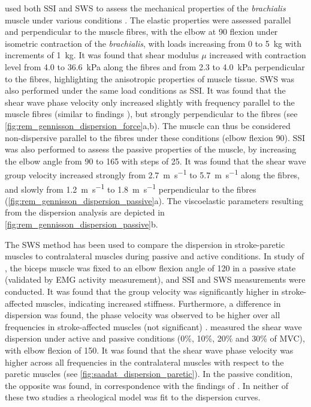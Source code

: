 \citeauthor{gennisson_viscoelastic_2010} used both SSI and SWS to assess the mechanical properties of the \textit{brachialis} muscle under various conditions \cite{gennisson_viscoelastic_2010}. The elastic properties were assessed parallel and perpendicular to the muscle fibres, with the elbow at \SI{90}{\deg} flexion under isometric contraction of the \textit{brachialis}, with loads increasing from 0 to \SI{5}{\kilogram} with increments of \SI{1}{\kilogram}. It was found that shear modulus $\mu$ increased with contraction level from 4.0 to \SI{36.6}{\kilo\pascal} along the fibres and from 2.3 to \SI{4.0}{\kilo\pascal} perpendicular to the fibres, highlighting the anisotropic properties of muscle tissue. SWS was also performed under the same load conditions as SSI. It was found that the shear wave phase velocity only increased slightly with frequency parallel to the muscle fibres (similar to findings \citet{deffieux_shear_2009}), but strongly perpendicular to the fibres (see \autoref{fig:rem_gennisson_dispersion_force}a,b). The muscle can thus be considered non-dispersive parallel to the fibres under these conditions (elbow flexion \SI{90}{\deg}). SSI was also performed to assess the passive properties of the muscle, by increasing the elbow angle from 90 to \SI{165}{\deg} with steps of \SI{25}{\deg}. It was found that the shear wave group velocity increased strongly from \SI{2.7}{\meter\per\second} to \SI{5.7}{\meter\per\second} along the fibres, and slowly from \SI{1.2}{\meter\per\second} to \SI{1.8}{\meter\per\second} perpendicular to the fibres (\autoref{fig:rem_gennisson_dispersion_passive}a). The viscoelastic parameters resulting from the dispersion analysis are depicted in \autoref{fig:rem_gennisson_dispersion_passive}b. %


The SWS method has been used to compare the dispersion in stroke-paretic muscles to contralateral muscles during passive \cite{rasool_altered_2016} and active \cite{saadat_frequency_2018} conditions. In study of \citeauthor{rasool_altered_2016}, the biceps muscle was fixed to an elbow flexion angle of \SI{120}{\deg} in a passive state (validated by EMG activity measurement), and SSI and SWS measurements were conducted. It was found that the group velocity was significantly higher in stroke-affected muscles, indicating increased stiffness. Furthermore, a difference in dispersion was found, the phase velocity was observed to be higher over all frequencies in stroke-affected muscles (not significant) \cite{rasool_altered_2016}. \citeauthor{saadat_frequency_2018} measured the shear wave dispersion under active and passive conditions (0\%, 10\%, 20\% and 30\% of MVC), with elbow flexion of \SI{150}{\deg}. It was found that the shear wave phase velocity was higher across all frequencies in the contralateral muscles with respect to the paretic muscles (see \autoref{fig:saadat_dispersion_paretic}). In the passive condition, the opposite was found, in correspondence with the findings of \citeauthor{rasool_altered_2016} \cite{saadat_frequency_2018}. In neither of these two studies a rheological model was fit to the dispersion curves.


